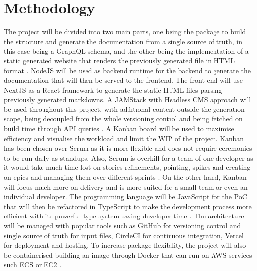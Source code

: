 \section*{Methodology}
\label{s:Methodology}
The project will be divided into two main parts, one being the package to build
the structure and generate the documentation from a single source of truth, in
this case being a GraphQL schema, and the other being the implementation of a
static generated website that renders the previously generated file in HTML
format \citep{gagliardiDjangoRESTMeets2021}. NodeJS will be used as backend
runtime for the backend to generate the documentation that will then be served
to the frontend. The front end will use NextJS as a React framework to generate
the static HTML files parsing previously generated markdowns. A JAMStack with
Headless CMS approach will be used throughout this project, with additional
content outside the generation scope, being decoupled from the whole versioning
control and being fetched on build time through API queries
\citep{zammettiWhatJAMstackAll2020}. A Kanban board will be used to maximise
efficiency and visualise the workload and limit the WIP of the project. Kanban
has been chosen over Scrum as it is more flexible and does not require
ceremonies to be run daily as standups. Also, Scrum is overkill for a team of
one developer as it would take much time lost on stories refinements, pointing,
spikes and creating on epics and managing them over different sprints
\citep{zayatFrameworkStudyAgile2020}. On the other hand, Kanban will focus much
more on delivery and is more suited for a small team or even an individual
developer. The programming language will be JavaScript for the PoC that will
then be refactored in TypeScript to make the development process more efficient
with its powerful type system saving developer time \citep{
freemanUnderstandingTypeScript2021}. The architecture will be managed with
popular tools such as GitHub for versioning control and single source of truth
for input files, CircleCI for continuous integration, Vercel for deployment and
hosting. To increase package flexibility, the project will also be containerised
building an image through Docker that can run on AWS services such ECS or EC2
\citep{pratapyadavFormalApproachDocker2021}.

